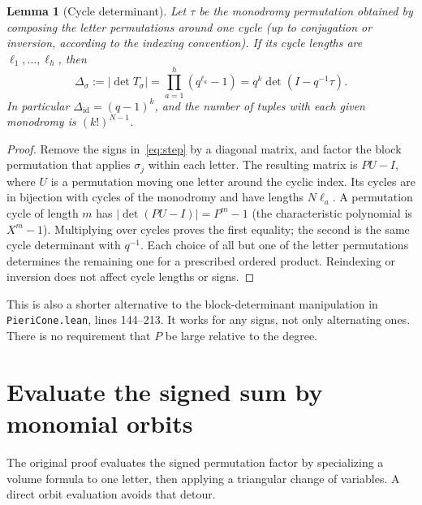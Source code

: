 \documentclass[11pt]{article}
\newtheorem{lemma}[theorem]{Lemma}
\theoremstyle{remark}\newtheorem{remark}[theorem]{Remark}
\newcommand{\code}[1]{\texttt{#1}}
\begin{document}
\begin{lemma}[Cycle determinant]\label{lem:det}
Let $\tau$ be the monodromy permutation obtained by composing the letter permutations around one cycle (up to conjugation or inversion, according to the indexing convention). If its cycle lengths are $\ell_1,\ldots,\ell_h$, then
\begin{equation}\label{eq:det}
 \Delta_\sigma:=|\det T_\sigma|=\prod_{a=1}^h(q^{\ell_a}-1)
 =q^k\det(I-q^{-1}\tau).
\end{equation}
In particular $\Delta_{\mathrm{id}}=(q-1)^k$, and the number of tuples with each given monodromy is $(k!)^{N-1}$.
\end{lemma}
\begin{proof}
Remove the signs in~\eqref{eq:step} by a diagonal matrix, and factor the block permutation that applies $\sigma_j$ within each letter. The resulting matrix is $PU-I$, where $U$ is a permutation moving one letter around the cyclic index. Its cycles are in bijection with cycles of the monodromy and have lengths $N\ell_a$. A permutation cycle of length $m$ has $|\det(PU-I)|=P^m-1$ (the characteristic polynomial is $X^m-1$). Multiplying over cycles proves the first equality; the second is the same cycle determinant with $q^{-1}$. Each choice of all but one of the letter permutations determines the remaining one for a prescribed ordered product. Reindexing or inversion does not affect cycle lengths or signs.
\end{proof}

This is also a shorter alternative to the block-determinant manipulation in \code{PieriCone.lean}, lines 144--213. It works for any signs, not only alternating ones. There is no requirement that $P$ be large relative to the degree.

\section{Evaluate the signed sum by monomial orbits}\label{sec:orbits}
The original proof evaluates the signed permutation factor by specializing a volume formula to one letter, then applying a triangular change of variables. A direct orbit evaluation avoids that detour.
\end{document}
